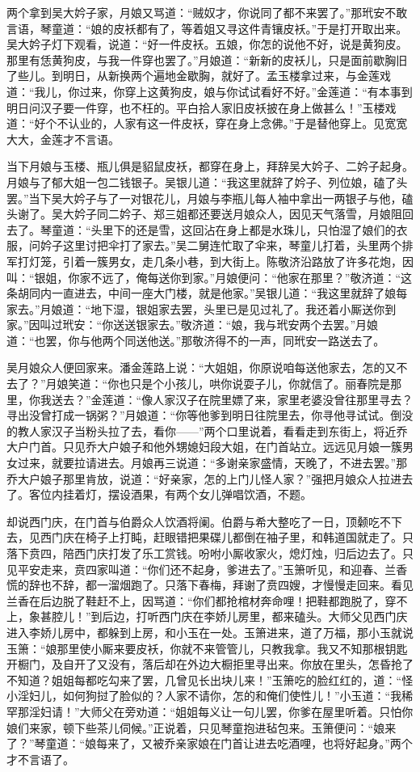 两个拿到吴大妗子家，月娘又骂道：“贼奴才，你说同了都不来罢了。”那玳安不敢言语，琴童道：“娘的皮袄都有了，等着姐又寻这件青镶皮袄。”于是打开取出来。吴大妗子灯下观看，说道：“好一件皮袄。五娘，你怎的说他不好，说是黄狗皮。那里有恁黄狗皮，与我一件穿也罢了。”月娘道：“新新的皮袄儿，只是面前歇胸旧了些儿。到明日，从新换两个遍地金歇胸，就好了。孟玉楼拿过来，与金莲戏道：“我儿，你过来，你穿上这黄狗皮，娘与你试试看好不好。”金莲道：“有本事到明日问汉子要一件穿，也不枉的。平白拾人家旧皮袄披在身上做甚么！”玉楼戏道：“好个不认业的，人家有这一件皮袄，穿在身上念佛。”于是替他穿上。见宽宽大大，金莲才不言语。

当下月娘与玉楼、瓶儿俱是貂鼠皮袄，都穿在身上，拜辞吴大妗子、二妗子起身。月娘与了郁大姐一包二钱银子。吴银儿道：“我这里就辞了妗子、列位娘，磕了头罢。”当下吴大妗子与了一对银花儿，月娘与李瓶儿每人袖中拿出一两银子与他，磕头谢了。吴大妗子同二妗子、郑三姐都还要送月娘众人，因见天气落雪，月娘阻回去了。琴童道：“头里下的还是雪，这回沾在身上都是水珠儿，只怕湿了娘们的衣服，问妗子这里讨把伞打了家去。”吴二舅连忙取了伞来，琴童儿打着，头里两个排军打灯笼，引着一簇男女，走几条小巷，到大街上。陈敬济沿路放了许多花炮，因叫：“银姐，你家不远了，俺每送你到家。”月娘便问：“他家在那里？”敬济道：“这条胡同内一直进去，中间一座大门楼，就是他家。”吴银儿道：“我这里就辞了娘每家去。”月娘道：“地下湿，银姐家去罢，头里已是见过礼了。我还着小厮送你到家。”因叫过玳安：“你送送银家去。”敬济道：“娘，我与玳安两个去罢。”月娘道：“也罢，你与他两个同送他送。”那敬济得不的一声，同玳安一路送去了。

吴月娘众人便回家来。潘金莲路上说：“大姐姐，你原说咱每送他家去，怎的又不去了？”月娘笑道：“你也只是个小孩儿，哄你说耍子儿，你就信了。丽春院是那里，你我送去？”金莲道：“像人家汉子在院里嫖了来，家里老婆没曾往那里寻去？寻出没曾打成一锅粥？”月娘道：“你等他爹到明日往院里去，你寻他寻试试。倒没的教人家汉子当粉头拉了去，看你——”两个口里说着，看看走到东街上，将近乔大户门首。只见乔大户娘子和他外甥媳妇段大姐，在门首站立。远远见月娘一簇男女过来，就要拉请进去。月娘再三说道：“多谢亲家盛情，天晚了，不进去罢。”那乔大户娘子那里肯放，说道：“好亲家，怎的上门儿怪人家？”强把月娘众人拉进去了。客位内挂着灯，摆设酒果，有两个女儿弹唱饮酒，不题。

却说西门庆，在门首与伯爵众人饮酒将阑。伯爵与希大整吃了一日，顶颡吃不下去，见西门庆在椅子上打盹，赶眼错把果碟儿都倒在袖子里，和韩道国就走了。只落下贲四，陪西门庆打发了乐工赏钱。吩咐小厮收家火，熄灯烛，归后边去了。只见平安走来，贲四家叫道：“你们还不起身，爹进去了。”玉箫听见，和迎春、兰香慌的辞也不辞，都一溜烟跑了。只落下春梅，拜谢了贲四嫂，才慢慢走回来。看见兰香在后边脱了鞋赶不上，因骂道：“你们都抢棺材奔命哩！把鞋都跑脱了，穿不上，象甚腔儿！”到后边，打听西门庆在李娇儿房里，都来磕头。大师父见西门庆进入李娇儿房中，都躲到上房，和小玉在一处。玉箫进来，道了万福，那小玉就说玉箫：“娘那里使小厮来要皮袄，你就不来管管儿，只教我拿。我又不知那根钥匙开橱门，及自开了又没有，落后却在外边大橱拒里寻出来。你放在里头，怎昏抢了不知道？姐姐每都吃勾来了罢，几曾见长出块儿来！”玉箫吃的脸红红的，道：“怪小淫妇儿，如何狗挝了脸似的？人家不请你，怎的和俺们使性儿！”小玉道：“我稀罕那淫妇请！”大师父在旁劝道：“姐姐每义让一句儿罢，你爹在屋里听着。只怕你娘们来家，顿下些茶儿伺候。”正说着，只见琴童抱进毡包来。玉箫便问：“娘来了？”琴童道：“娘每来了，又被乔亲家娘在门首让进去吃酒哩，也将好起身。”两个才不言语了。

